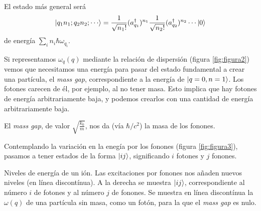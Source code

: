 \documentclass[a4paper,11pt]{tufte-book}
\begin{document}
El estado más general será
\begin{equation}
  \ket{q_1 n_1; q_2 n_2; \cdots} = \frac{1}{\sqrt{n_1!}}(a^\dagger_{q_1})^{n_1}
  \frac{1}{\sqrt{n_2!}}(a^\dagger_{q_2})^{n_2} \cdots \ket{0}
\end{equation}
de energía $\sum_{i} n_i ℏ ω_{q_i}$.

Si representamos $ω_q(q)$ mediante la relación de dispersión (figura
\ref{fig:figura2}) vemos que necesitamos una energía para pasar del
estado fundamental a crear una partícula, el \emph{mass gap},
correspondiente a la energía de $\ket{q=0,n=1}$.
Los fotones carecen de él, por ejemplo, al no tener masa. Esto
implica que hay fotones de energía arbitrariamente baja, y podemos
crearlos con una cantidad de energía arbitrariamente baja.


\begin{marginfigure}
  \caption{El \emph{mass gap}, de valor $\sqrt{\frac{k_0}{m}}$, nos da
    (vía $ℏ/c^2$) la masa de los fonones.}
  \label{fig:figura2}
\end{marginfigure}

Contemplando la variación en la enegía por los fonones (figura \ref{fig:figura3}),
pasamos a tener estados de la forma $\ket{ij}$, significando $i$
fotones y $j$ fonones.


\begin{marginfigure}
  \caption{Niveles de energía de un ión. Las excitaciones por fonones
    nos añaden nuevos niveles (en línea discontínua). A la derecha se
    muestra $\ket{ij}$, correspondiente al número $i$ de fotones y al
    número $j$ de fonones. Se muestra en línea discontínua la $ω(q)$
    de una partícula sin masa, como un fotón, para la que el \emph{mass gap}
    es nulo.}
  \label{fig:figura3}
\end{marginfigure}
\end{document}
